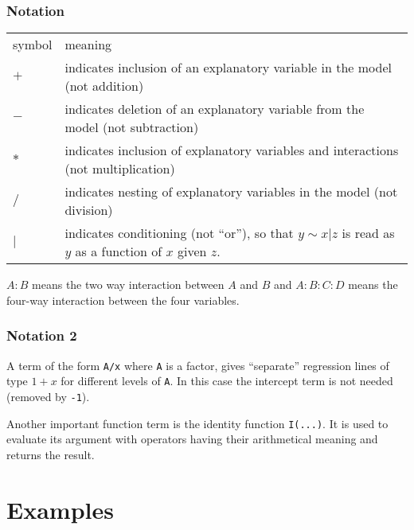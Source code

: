 \documentclass[xcolor={table},handout]{beamer}
\begin{document}
\begin{frame}\frametitle{Notation}
\begin{center}
  \begin{tabular}{@{} >{\ttfamily}l p{9cm}} 
    \rowcolor{gray!40}
symbol & meaning\\
$+$ & indicates inclusion of an explanatory variable in the model (not addition)\\
$-$ & indicates deletion of an explanatory variable from the model (not subtraction)\\
$*$ & indicates inclusion of explanatory variables and interactions (not multiplication)\\
$/$ & indicates nesting of explanatory variables in the model (not division)\\
$|$ & indicates conditioning (not ``or''), so that $y \sim x | z $ is read as $y$ as a function of $x$ given $z$.\\
\end{tabular}
\end{center}
$A:B$ means the two way interaction between $A$ and $B$ and $A:B:C:D$ means the four-way interaction between the four variables.
\end{frame}

\begin{frame}\frametitle{Notation 2}
A term of the form \texttt{A/x} where \texttt{A} is a factor, gives ``separate'' regression lines of type $1+x$ for different levels of \texttt{A}. In this case the intercept term is not needed (removed by \texttt{-1}).

Another important function term is the identity function \texttt{I(...)}. It is used to evaluate its argument with operators having their arithmetical meaning and returns the result. 
\end{frame}

\section{Examples}
\end{document}
